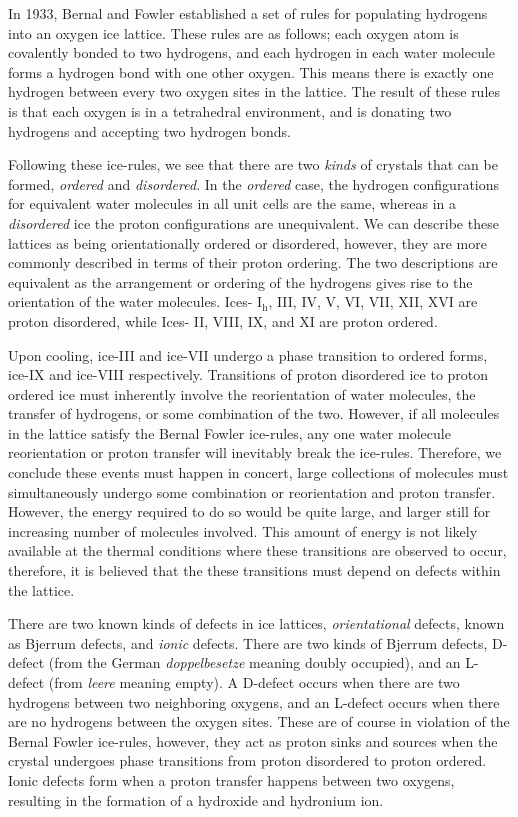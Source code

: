 In 1933, Bernal and Fowler established a set of rules for populating
hydrogens into an oxygen ice lattice.\cite{Bernal1933} These rules are
as follows; each oxygen atom is covalently bonded to two hydrogens,
and each hydrogen in each water molecule forms a hydrogen bond with
one other oxygen. This means there is exactly one hydrogen between
every two oxygen sites in the lattice. The result of these rules is
that each oxygen is in a tetrahedral environment, and is donating two
hydrogens and accepting two hydrogen bonds.

Following these ice-rules, we see that there are two \textit{kinds} of
crystals that can be formed, \textit{ordered} and
\textit{disordered}. In the \textit{ordered} case, the hydrogen
configurations for equivalent water molecules in all unit cells are
the same, whereas in a \textit{disordered} ice the proton
configurations are unequivalent. We can describe these lattices as
being orientationally ordered or disordered, however, they are more
commonly described in terms of their proton ordering. The two
descriptions are equivalent as the arrangement or ordering of the
hydrogens gives rise to the orientation of the water molecules.  Ices-
I$_\mathrm{h}$, III, IV, V, VI, VII, XII, XVI are proton disordered,
while Ices- II, VIII, IX, and XI are proton ordered.

Upon cooling, ice-III and ice-VII undergo a phase transition to
ordered forms, ice-IX and ice-VIII respectively. Transitions of proton
disordered ice to proton ordered ice must inherently involve the
reorientation of water molecules, the transfer of
hydrogens, or some combination of the two. However, if all molecules
in the lattice satisfy the Bernal Fowler ice-rules, any one water
molecule reorientation or proton transfer will inevitably break the
ice-rules. Therefore, we conclude these events must happen in concert,
large collections of molecules must simultaneously undergo some
combination or reorientation and proton transfer. However, the energy
required to do so would be quite large, and larger still for
increasing number of molecules involved. This amount of energy is not
likely available at the thermal conditions where these transitions are
observed to occur, therefore, it is believed that the these
transitions must depend on defects within the lattice.

There are two known kinds of defects in ice
lattices, \textit{orientational} defects, known as Bjerrum defects,
and \textit{ionic} defects. There are two kinds of Bjerrum defects,
D-defect (from the German \textit{doppelbesetze} meaning doubly
occupied), and an L-defect (from \textit{leere} meaning empty). A
D-defect occurs when there are two hydrogens between two neighboring
oxygens, and an L-defect occurs when there are no hydrogens between
the oxygen sites. These are of course in violation of the Bernal
Fowler ice-rules, however, they act as proton sinks and sources when
the crystal undergoes phase transitions from proton disordered to
proton ordered. Ionic defects form when a proton transfer happens
between two oxygens, resulting in the formation of a hydroxide and
hydronium ion.

